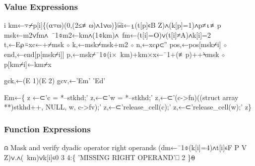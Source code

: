 \documentclass{article}%
\begin{document}
\subsubsection{Value Expressions}

\nwenddocs{}\endmoddef\nwstartdeflinemarkup{}\nwenddeflinemarkup
i km←⍪⌿p[i]\{(⍺⍪⍵)(0,(2≤≢⍵)∧1∨⍵)\}⌸i←⍸(t[p]∊B Z)∧(k[p]=1)∧p≠⍳≢p
msk←m2∨fm∧~¯1⌽m2←km∧(1⌽km)∧~fm←(t[i]=O)∨(t[i]≠A)∧k[i]=2
t,←E⍴⍨xc←+⌿msk ⋄ k,←msk⌿msk+m2 ⋄ n,←xc⍴⊂''
pos,←pos[msk⌿i] ⋄ end,←end[p[msk⌿i]]
p,←msk⌿¯1⌽(i×~km)+km×x←¯1+(≢p)++⍀msk ⋄ p[km⌿i]←km⌿x
\nwendcode{}\nwdocspar

\nwenddocs{}\plusendmoddef\nwstartdeflinemarkup{}\nwenddeflinemarkup
gck,←(E 1)(E 2)
gcv,←'Em' 'Ed'
\nwendcode{}\nwdocspar

\nwenddocs{}\plusendmoddef\nwstartdeflinemarkup{}\nwenddeflinemarkup
Em←\{
        z ←⊂'c = *--stkhd;'
        z,←⊂'w = *--stkhd;'
        z,←⊂'(c->fn)((struct array **)stkhd++, NULL, w, c->fv);'
        z,←⊂'release_cell(c);'
        z,←⊂'release_cell(w);'
z\}
\nwendcode{}\nwdocspar

\subsubsection{Function Expressions}

\nwenddocs{}\endmoddef\nwstartdeflinemarkup{}\nwenddeflinemarkup
⍝ Mask and verify dyadic operator right operands
(dm←¯1⌽(k[i]=4)∧t[i]∊F P V Z)∨.∧(~km)∨k[i]∊0 3 4:\{
        'MISSING RIGHT OPERAND'⎕ 2
\}⍬
\end{document}
